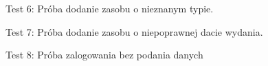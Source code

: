 \begin{figure}[H]
    \centering
    \caption{Test 6: Próba dodanie zasobu o nieznanym typie.}
\end{figure}

\begin{figure}[H]
    \centering
    \caption{Test 7: Próba dodanie zasobu o niepoprawnej dacie wydania.}
\end{figure}

\begin{figure}[H]
    \centering
    \caption{Test 8: Próba zalogowania bez podania danych}
\end{figure}

